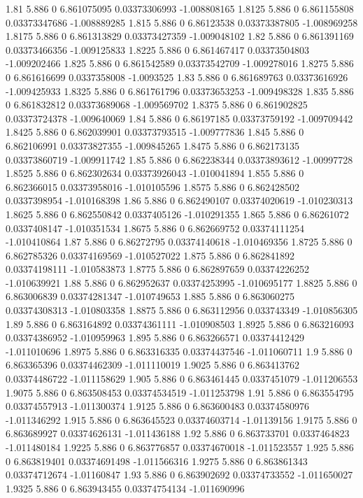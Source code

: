 {1.81 5.886 0 6.861075095 0.03373306993 -1.008808165
1.8125 5.886 0 6.861155808 0.03373347686 -1.008889285
1.815 5.886 0 6.86123538 0.03373387805 -1.008969258
1.8175 5.886 0 6.861313829 0.03373427359 -1.009048102
1.82 5.886 0 6.861391169 0.03373466356 -1.009125833
1.8225 5.886 0 6.861467417 0.03373504803 -1.009202466
1.825 5.886 0 6.861542589 0.03373542709 -1.009278016
1.8275 5.886 0 6.861616699 0.0337358008 -1.0093525
1.83 5.886 0 6.861689763 0.03373616926 -1.009425933
1.8325 5.886 0 6.861761796 0.03373653253 -1.009498328
1.835 5.886 0 6.861832812 0.03373689068 -1.009569702
1.8375 5.886 0 6.861902825 0.03373724378 -1.009640069
1.84 5.886 0 6.86197185 0.03373759192 -1.009709442
1.8425 5.886 0 6.862039901 0.03373793515 -1.009777836
1.845 5.886 0 6.862106991 0.03373827355 -1.009845265
1.8475 5.886 0 6.862173135 0.03373860719 -1.009911742
1.85 5.886 0 6.862238344 0.03373893612 -1.00997728
1.8525 5.886 0 6.862302634 0.03373926043 -1.010041894
1.855 5.886 0 6.862366015 0.03373958016 -1.010105596
1.8575 5.886 0 6.862428502 0.0337398954 -1.010168398
1.86 5.886 0 6.862490107 0.03374020619 -1.010230313
1.8625 5.886 0 6.862550842 0.0337405126 -1.010291355
1.865 5.886 0 6.86261072 0.0337408147 -1.010351534
1.8675 5.886 0 6.862669752 0.03374111254 -1.010410864
1.87 5.886 0 6.86272795 0.03374140618 -1.010469356
1.8725 5.886 0 6.862785326 0.03374169569 -1.010527022
1.875 5.886 0 6.862841892 0.03374198111 -1.010583873
1.8775 5.886 0 6.862897659 0.03374226252 -1.010639921
1.88 5.886 0 6.862952637 0.03374253995 -1.010695177
1.8825 5.886 0 6.863006839 0.03374281347 -1.010749653
1.885 5.886 0 6.863060275 0.03374308313 -1.010803358
1.8875 5.886 0 6.863112956 0.033743349 -1.010856305
1.89 5.886 0 6.863164892 0.03374361111 -1.010908503
1.8925 5.886 0 6.863216093 0.03374386952 -1.010959963
1.895 5.886 0 6.863266571 0.03374412429 -1.011010696
1.8975 5.886 0 6.863316335 0.03374437546 -1.011060711
1.9 5.886 0 6.863365396 0.03374462309 -1.011110019
1.9025 5.886 0 6.863413762 0.03374486722 -1.011158629
1.905 5.886 0 6.863461445 0.0337451079 -1.011206553
1.9075 5.886 0 6.863508453 0.03374534519 -1.011253798
1.91 5.886 0 6.863554795 0.03374557913 -1.011300374
1.9125 5.886 0 6.863600483 0.03374580976 -1.011346292
1.915 5.886 0 6.863645523 0.03374603714 -1.01139156
1.9175 5.886 0 6.863689927 0.03374626131 -1.011436188
1.92 5.886 0 6.863733701 0.0337464823 -1.011480184
1.9225 5.886 0 6.863776857 0.03374670018 -1.011523557
1.925 5.886 0 6.863819401 0.03374691498 -1.011566316
1.9275 5.886 0 6.863861343 0.03374712674 -1.01160847
1.93 5.886 0 6.863902692 0.03374733552 -1.011650027
1.9325 5.886 0 6.863943455 0.03374754134 -1.011690996
}

